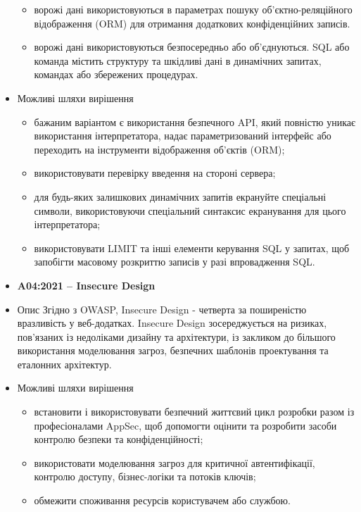 \begin{itemize}
\begin{itemize}
                    \item ворожі дані використовуються в параметрах пошуку об’єктно-реляційного відображення (ORM) для отримання додаткових конфіденційних записів.
                    \item ворожі дані використовуються безпосередньо або об’єднуються. SQL або команда містить структуру та шкідливі дані в динамічних запитах, командах або збережених процедурах.
                \end{itemize}
            \item Можливі шляхи вирішення
                \begin{itemize}
                    \item бажаним варіантом є використання безпечного API, який повністю уникає використання інтерпретатора, надає параметризований інтерфейс або переходить на інструменти відображення об’єктів (ORM);
                    \item використовувати перевірку введення на стороні сервера;
                    \item для будь-яких залишкових динамічних запитів екрануйте спеціальні символи, використовуючи спеціальний синтаксис екранування для цього інтерпретатора;  
                    \item використовувати LIMIT та інші елементи керування SQL у запитах, щоб запобігти масовому розкриттю записів у разі впровадження SQL.
                \end{itemize}
    \item \textbf{A04:2021 – Insecure Design} 
            \item Опис
                Згідно з OWASP, Insecure Design - четверта за поширеністю вразливість у веб-додатках. Insecure Design зосереджується на ризиках, пов’язаних із недоліками дизайну та архітектури, із закликом до більшого використання моделювання загроз, безпечних шаблонів проектування та еталонних архітектур. 
            \item Можливі шляхи вирішення
                \begin{itemize}
                    \item встановити і використовувати безпечний життєвий цикл розробки разом із професіоналами AppSec, щоб допомогти оцінити та розробити засоби контролю безпеки та конфіденційності;
                    \item використовати моделювання загроз для критичної автентифікації, контролю доступу, бізнес-логіки та потоків ключів;
                    \item обмежити споживання ресурсів користувачем або службою.

\end{itemize}
\end{itemize}
